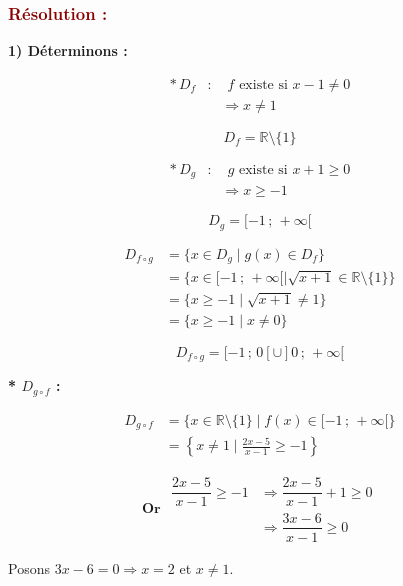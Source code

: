 \documentclass[12pt,a4paper]{article}
\begin{document}
\subsubsection*{\textcolor{darkred}{Résolution :}}

\textbf{1) Déterminons :}

\[
\begin{aligned}
*\,D_f &: \quad f\text{ existe si }x-1\neq0\\
&\quad\Longrightarrow x\neq1
\end{aligned}
\]

\[
\boxed{D_f=\mathbb{R}\setminus\{1\}}
\]

\[
\begin{aligned}
*\,D_g &: \quad g\text{ existe si }x+1\geq0\\
&\quad\Longrightarrow x\geq-1
\end{aligned}
\]

\[
\boxed{D_g=[-1\,;\,+\infty[}
\]

\[
\begin{aligned}
D_{f\circ g}
&=
\{x\in D_g\mid g(x)\in D_f\}\\
&=
\{x\in[-1\,;\,+\infty[
\mid
\sqrt{x+1}\in\mathbb{R}\setminus\{1\}\}\\
&=
\{x\geq -1\mid \sqrt{x+1}\neq1\}\\
&=
\{x\geq -1\mid x\neq0\}
\end{aligned}
\]

\[
\boxed{
D_{f\circ g}
=
[-1\,;\,0[\cup]0\,;\,+\infty[
}
\]

\textbf{* $D_{g\circ f}$ :}

\[
\begin{aligned}
D_{g\circ f}
&=
\{x\in\mathbb{R}\setminus\{1\}\mid f(x)\in[-1\,;\,+\infty[\}\\
&=
\left\{x\neq1\mid
\frac{2x-5}{x-1}\geq-1\right\}
\end{aligned}
\]


\[\textbf{Or }
\begin{aligned}
\dfrac{2x-5}{x-1}\geq-1
&\Longrightarrow
\dfrac{2x-5}{x-1}+1\geq0\\
&\Longrightarrow
\dfrac{3x-6}{x-1}\geq0
\end{aligned}
\]

Posons $3x-6=0\Longrightarrow x=2$
et $x\neq1$.

\begin{center}
\end{center}
\end{document}
